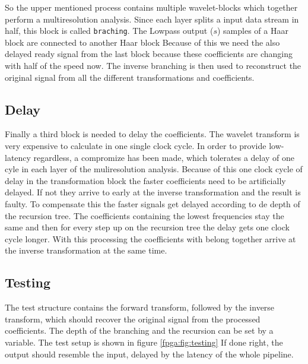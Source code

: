 \begin{refsection}

So the upper mentioned process contains multiple wavelet-blocks which together perform a multiresolution analysis.
Since each layer splits a input data stream in half, this block is called \texttt{braching}.
The Lowpass output ($s$) samples of a Haar block are connected to another Haar block 
Because of this we need the also delayed ready signal from the last block because these coefficients are changing with half of the speed now. 
The inverse branching is then used to reconstruct the original signal from all the different transformations and coefficients.


\subsection{Delay}

Finally a third block is needed to delay the coefficients.
The wavelet transform is very expensive to calculate in one single clock cycle.
In order to provide low-latency regardless, a compromize has been made, which tolerates a delay of one cyle in each layer of the muliresolution analysis.
Because of this one clock cycle of delay in the transformation block the faster coefficients need to be artificially delayed.
If not they arrive to early at the inverse transformation and the result is faulty. To compensate this the   faster signals get delayed according to de depth of the recursion tree.
The coefficients containing the lowest frequencies stay the same and then for every step up on the recursion tree the delay gets one clock cycle longer.
With this processing the coefficients with belong together arrive at the inverse transformation at the same time.




\subsection{Testing}

The test structure contains the forward transform, followed by the inverse transform, which should recover the original signal from the processed coefficients.
The depth of the branching and the recursion can be set by a variable. 
The test setup is shown in figure \ref{fpga:fig:testing}
If done right, the output should resemble the input, delayed by the latency of the whole pipeline.


\end{refsection}
